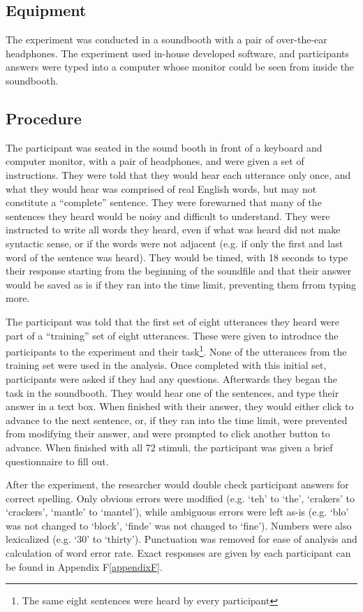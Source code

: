 \documentclass[dissertation,copyright]{uathesis}
\begin{document}
\subsection{Equipment}

The experiment was conducted in a soundbooth with a pair of over-the-ear headphones.  The experiment used in-house developed software, and participants answers were typed into a computer whose monitor could be seen from inside the soundbooth.

\subsection{Procedure}
\label{hsp-main-procedure}

The participant was seated in the sound booth in front of a keyboard and computer monitor, with a pair of headphones, and were given a set of instructions. They were told that they would hear each utterance only once, and what they would hear was comprised of real English words, but may not constitute a ``complete'' sentence.  They were forewarned that many of the sentences they heard would be noisy and difficult to understand. They were instructed to write all words they heard, even if what was heard did not make syntactic sense, or if the words were not adjacent (e.g. if only the first and last word of the sentence was heard). They would be timed, with 18 seconds to type their response starting from the beginning of the soundfile and that their answer would be saved as is if they ran into the time limit, preventing them frrom typing more.

The participant was told that the first set of eight utterances they heard were part of a ``training'' set of eight utterances.  These were given to introduce the participants to the experiment and their task\footnote{The same eight sentences were heard by every participant}.  None of the utterances from the training set were used in the analysis.  Once completed with this initial set, participants were asked if they had any questions.  Afterwards they began the task in the soundbooth.  They would hear one of the sentences, and type their answer in a text box.  When finished with their answer, they would either click to advance to the next sentence, or, if they ran into the time limit, were prevented from modifying their answer, and were prompted to click another button to advance.  When finished with all 72 stimuli, the participant was given a brief questionnaire to fill out.  

After the experiment, the researcher would double check participant answers for correct spelling.  Only obvious errors were modified (e.g. `teh' to `the', `crakers' to `crackers', `mantle' to `mantel'), while ambiguous errors were left as-is (e.g. `blo' was not changed to `block', `finde' was not changed to `fine').  Numbers were also lexicalized (e.g. `30' to `thirty').  Punctuation was removed for ease of analysis and calculation of word error rate.  Exact responses are given by each participant can be found in Appendix F\ref{appendixF}.
\end{document}

